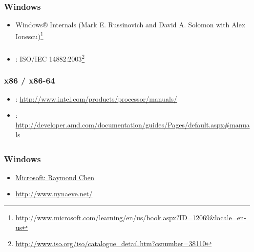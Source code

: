 ﻿%

\chapter{}

\section{}

\subsection{Windows}

\begin{itemize}
\item
Windows® Internals (Mark E. Russinovich and David A. Solomon with Alex Ionescu)\footnote{\url{http://www.microsoft.com/learning/en/us/book.aspx?ID=12069&locale=en-us}}
\end{itemize}

\subsection{\CCpp}

\begin{itemize}
\item
{}: ISO/IEC 14882:2003\footnote{\url{http://www.iso.org/iso/catalogue_detail.htm?csnumber=38110}}
\end{itemize}

\subsection{x86 / x86-64}

\begin{itemize}
\item
{}: \url{http://www.intel.com/products/processor/manuals/}
\item
{}: \url{http://developer.amd.com/documentation/guides/Pages/default.aspx#manuals}
\end{itemize}

\section{}

\subsection{Windows}

\begin{itemize}
\item
\href{http://blogs.msdn.com/oldnewthing/}{Microsoft: Raymond Chen}
\item
\url{http://www.nynaeve.net/}
\end{itemize}

